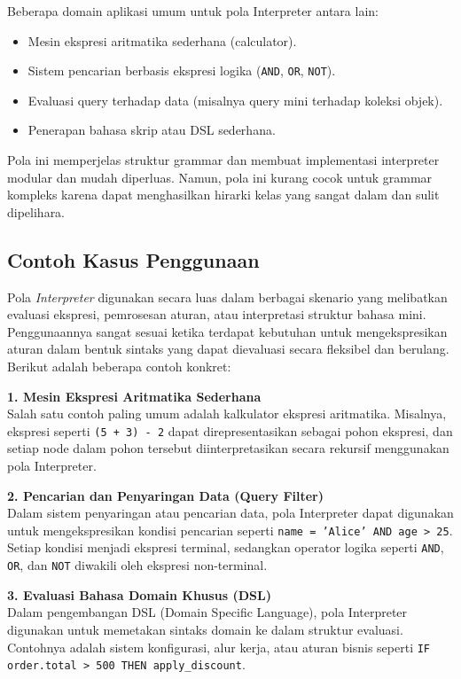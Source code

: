 Beberapa domain aplikasi umum untuk pola Interpreter antara lain:
\begin{itemize}
	\item Mesin ekspresi aritmatika sederhana (calculator).
	\item Sistem pencarian berbasis ekspresi logika (\texttt{AND}, \texttt{OR}, \texttt{NOT}).
	\item Evaluasi query terhadap data (misalnya query mini terhadap koleksi objek).
	\item Penerapan bahasa skrip atau DSL sederhana.
\end{itemize}

Pola ini memperjelas struktur grammar dan membuat implementasi interpreter modular dan mudah diperluas. Namun, pola ini kurang cocok untuk grammar kompleks karena dapat menghasilkan hirarki kelas yang sangat dalam dan sulit dipelihara.


\subsection{Contoh Kasus Penggunaan}

Pola \textit{Interpreter} digunakan secara luas dalam berbagai skenario yang melibatkan evaluasi ekspresi, pemrosesan aturan, atau interpretasi struktur bahasa mini. Penggunaannya sangat sesuai ketika terdapat kebutuhan untuk mengekspresikan aturan dalam bentuk sintaks yang dapat dievaluasi secara fleksibel dan berulang. Berikut adalah beberapa contoh konkret:

\textbf{1. Mesin Ekspresi Aritmatika Sederhana} \\
Salah satu contoh paling umum adalah kalkulator ekspresi aritmatika. Misalnya, ekspresi seperti \texttt{(5 + 3) - 2} dapat direpresentasikan sebagai pohon ekspresi, dan setiap node dalam pohon tersebut diinterpretasikan secara rekursif menggunakan pola Interpreter.

\textbf{2. Pencarian dan Penyaringan Data (Query Filter)} \\
Dalam sistem penyaringan atau pencarian data, pola Interpreter dapat digunakan untuk mengekspresikan kondisi pencarian seperti \texttt{name = 'Alice' AND age > 25}. Setiap kondisi menjadi ekspresi terminal, sedangkan operator logika seperti \texttt{AND}, \texttt{OR}, dan \texttt{NOT} diwakili oleh ekspresi non-terminal.

\textbf{3. Evaluasi Bahasa Domain Khusus (DSL)} \\
Dalam pengembangan DSL (Domain Specific Language), pola Interpreter digunakan untuk memetakan sintaks domain ke dalam struktur evaluasi. Contohnya adalah sistem konfigurasi, alur kerja, atau aturan bisnis seperti \texttt{IF order.total > 500 THEN apply\_discount}.

